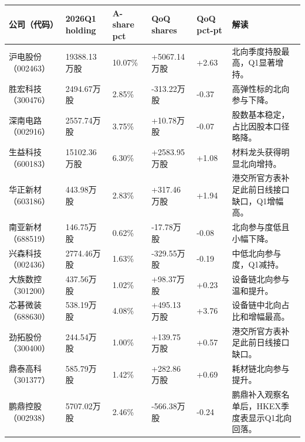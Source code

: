 \begin{exhibitbox}
\footnotesize
\begin{tabularx}{\textwidth}{L{1.8cm}R{1.9cm}R{1.5cm}R{1.8cm}R{1.4cm}X}
\toprule
\textbf{公司（代码）} & \textbf{2026Q1 holding} & \textbf{A-share pct} & \textbf{QoQ shares} & \textbf{QoQ pct-pt} & \textbf{解读} \\
\midrule
沪电股份（002463） & 19388.13万股 & 10.07\% & +5067.14万股 & +2.63 & 北向季度持股最高，Q1显著增持。 \\
胜宏科技（300476） & 2494.67万股 & 2.85\% & -313.22万股 & -0.37 & 高弹性标的北向参与下降。 \\
深南电路（002916） & 2557.74万股 & 3.75\% & +10.78万股 & -0.07 & 股数基本稳定，占比因股本口径略降。 \\
生益科技（600183） & 15102.36万股 & 6.30\% & +2583.95万股 & +1.08 & 材料龙头获得明显北向增持。 \\
华正新材（603186） & 443.98万股 & 2.83\% & +317.46万股 & +1.94 & 港交所官方表补足此前日线接口缺口，Q1增幅高。 \\
南亚新材（688519） & 146.75万股 & 0.62\% & -17.78万股 & -0.08 & 北向参与度低且小幅下降。 \\
兴森科技（002436） & 2774.46万股 & 1.63\% & -329.55万股 & -0.19 & 中低北向参与度，Q1减持。 \\
大族数控（301200） & 437.56万股 & 1.02\% & +98.37万股 & +0.23 & 设备链北向参与温和提升。 \\
芯碁微装（688630） & 538.19万股 & 4.08\% & +495.13万股 & +3.76 & 设备链中北向占比和增幅最高。 \\
劲拓股份（300400） & 244.54万股 & 1.00\% & +139.75万股 & +0.57 & 港交所官方表补足此前日线接口缺口。 \\
鼎泰高科（301377） & 585.79万股 & 1.42\% & +282.86万股 & +0.69 & 耗材链北向参与提升。 \\
鹏鼎控股（002938） & 5707.02万股 & 2.46\% & -566.38万股 & -0.24 & 鹏鼎补入观察名单后，HKEX季度表显示Q1北向回落。 \\
\bottomrule
\end{tabularx}
\end{exhibitbox}

